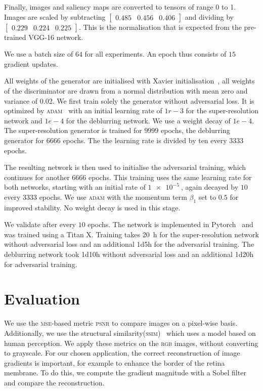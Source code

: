 \documentclass{scrartcl}
\begin{document}
Finally, images and saliency maps are converted to tensors of range 0 to 1.
Images are scaled by subtracting
\(
\begin{bmatrix}
 0.485 & 0.456 & 0.406 
\end{bmatrix}
\)
and dividing by
\(
\begin{bmatrix}
0.229 & 0.224& 0.225
\end{bmatrix}
\).
This is the normalisation that is expected from the pre-trained VGG-16 network.

We use a batch size of $64$ for all experiments.
An epoch thus consists of $15$ gradient updates.

All weights of the generator are initialised with Xavier initialisation~\cite{Xavier}, all weights of the discriminator are drawn from a normal distribution with mean zero and variance of 0.02. 
We first train solely the generator without adversarial loss.
It is optimized by \textsc{adam}~\cite{Adam} with an initial learning rate of $1r-3$ for the super-resolution network and $1e-4$ for the deblurring network.
We use a weight decay of $1e-4$.
The super-resolution generator is trained for $9999$ epochs, the deblurring generator for $6666$ epochs.
The the learning rate is divided by ten every $3333$ epochs.

The resulting network is then used to initialise the adversarial training, which continues for another $6666$ epochs.
This training uses the same learning rate for both networks, starting with an initial rate of $\SI{1e-5}{}$, again decayed by $10$ every $3333$ epochs.
We use \textsc{adam} with the momentum term $\beta_1$ set to $0.5$ for improved stability.
No weight decay is used in this stage.

We validate after every $10$ epochs.
The network is implemented in Pytorch~\cite{Pytorch} and was trained using a Titan X.
Training takes \SI{20}{\hour} for the super-resolution network without adversarial loss and an additional 1d5h for the adversarial training.
The deblurring network took 1d10h without adversarial loss and an additional 1d20h for adversarial training.

\section{Evaluation}
We use the \textsc{mse}-based metric \textsc{psnr} to compare images on a pixel-wise basis.
Additionally, we use the structural similarity(\textsc{ssim})~\cite{Ssim} which uses a model based on human perception.
We apply these metrics on the \textsc{rgb} images, without converting to grayscale.
For our chosen application, the correct reconstruction of image gradients is important, for example to enhance the border of the retina membrane.
To do this, we compute the gradient magnitude with a Sobel filter and compare the reconstruction.
\end{document}
